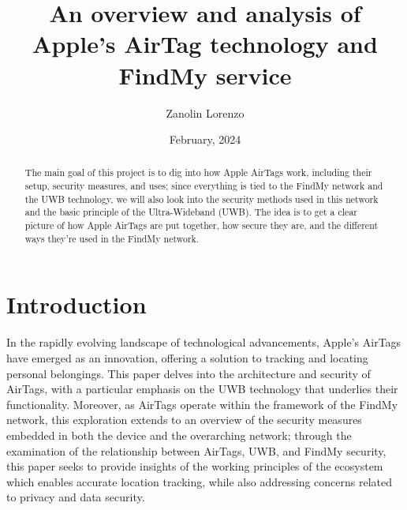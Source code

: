 \documentclass[english]{article}
\title{An overview and analysis of Apple’s AirTag technology and FindMy service}
\author{Zanolin Lorenzo}
\date{February, 2024}
\begin{document}
\maketitle

\tableofcontents
\newpage


\begin{abstract}
  The main goal of this project is to dig into how Apple AirTags work, including their setup, security measures, and uses; since everything is tied to the FindMy network and the UWB technology, we will also look into the security methods used in this network and the basic principle of the Ultra-Wideband (UWB). The idea is to get a clear picture of how Apple AirTags are put together, how secure they are, and the different ways they're used in the FindMy network.
\end{abstract}

\section{Introduction}\label{sec:intro}
In the rapidly evolving landscape of technological advancements, Apple's AirTags have emerged as an innovation, offering a solution to tracking and locating personal belongings. This paper delves into the architecture and security of AirTags, with a particular emphasis on the UWB technology that underlies their functionality. Moreover, as AirTags operate within the framework of the FindMy network, this exploration extends to an overview of the security measures embedded in both the device and the overarching network; through the examination of the relationship between AirTags, UWB, and FindMy security, this paper seeks to provide insights of the working principles of the ecosystem which enables accurate location tracking, while also addressing concerns related to privacy and data security. 

\end{document}
